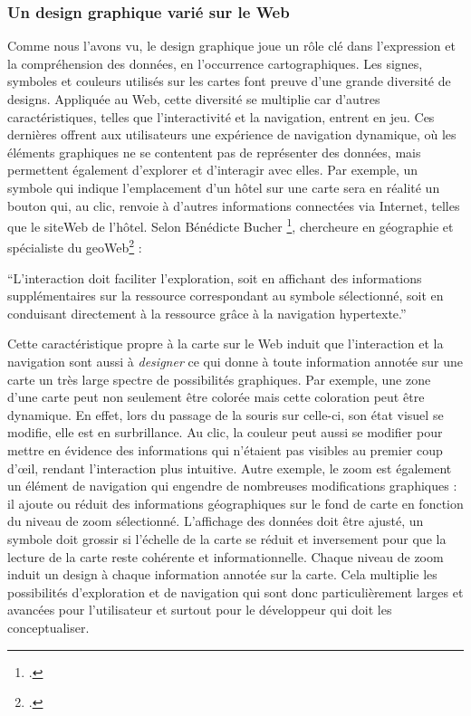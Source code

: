 \subsubsection{Un design graphique varié sur le Web}
Comme nous l'avons vu, le design graphique joue un rôle clé dans l'expression et la compréhension des données, en l'occurrence cartographiques. Les signes, symboles et couleurs utilisés sur les cartes font preuve d'une grande diversité de designs. Appliquée au Web, cette diversité se multiplie car d'autres caractéristiques, telles que l'interactivité et la navigation, entrent en jeu. Ces dernières offrent aux utilisateurs une expérience de navigation dynamique, où les éléments graphiques ne se contentent pas de représenter des données, mais permettent également d'explorer et d'interagir avec elles. Par exemple, un symbole qui indique l'emplacement d'un hôtel sur une carte sera en réalité un bouton qui, au clic, renvoie à d'autres informations connectées via Internet, telles que le siteWeb de l'hôtel. Selon Bénédicte Bucher \footcite{BUCHERcarte2007}, chercheure en géographie et spécialiste du geoWeb\footcite{JOLIVEAUgeoweb2011} : 
\begin{displayquote}
    \enquote{L'interaction doit faciliter l’exploration, soit en affichant des informations supplémentaires sur la ressource correspondant au symbole sélectionné, soit en conduisant directement à la ressource grâce à la navigation hypertexte.}
\end{displayquote}
Cette caractéristique propre à la carte sur le Web induit que l'interaction et la navigation sont aussi à \textit{designer} ce qui donne à toute information annotée sur une carte un très large spectre de possibilités graphiques. Par exemple, une zone d'une carte peut non seulement être colorée mais cette coloration peut être dynamique. En effet, lors du passage de la souris sur celle-ci, son état visuel se modifie, elle est en surbrillance. Au clic, la couleur peut aussi se modifier pour mettre en évidence des informations qui n'étaient pas visibles au premier coup d'œil, rendant l'interaction plus intuitive. Autre exemple, le zoom est également un élément de navigation qui engendre de nombreuses modifications graphiques : il ajoute ou réduit des informations géographiques sur le fond de carte en fonction du niveau de zoom sélectionné. L'affichage des données doit être ajusté, un symbole doit grossir si l'échelle de la carte se réduit et inversement pour que la lecture de la carte reste cohérente et informationnelle. Chaque niveau de zoom induit un design à chaque information annotée sur la carte. Cela multiplie les possibilités d'exploration et de navigation qui sont donc particulièrement larges et avancées pour l'utilisateur et surtout pour le développeur qui doit les conceptualiser.

